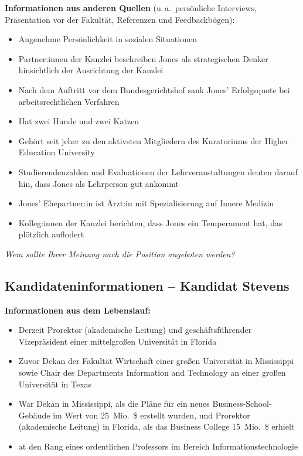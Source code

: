 \textbf{Informationen aus anderen Quellen}
(u.\,a.\ persönliche Interviews, Präsentation vor der Fakultät, Referenzen und Feedbackbögen):
\begin{itemize}
  \item Angenehme Persönlichkeit in sozialen Situationen
  \item Partner:innen der Kanzlei beschreiben Jones als strategischen Denker hinsichtlich der Ausrichtung
    der Kanzlei
  \item Nach dem Auftritt vor dem Bundesgerichtshof sank Jones' Erfolgsquote bei arbeitsrechtlichen Verfahren
  \item Hat zwei Hunde und zwei Katzen
  \item Gehört seit jeher zu den aktivsten Mitgliedern des Kuratoriums der Higher Education
    University
  \item Studierendenzahlen und Evaluationen der Lehrveranstaltungen deuten darauf hin, dass Jones als
    Lehrperson gut ankommt
  \item Jones' Ehepartner:in ist Ärzt:in mit Spezialisierung auf Innere Medizin
  \item Kolleg:innen der Kanzlei berichten, dass Jones ein Temperament hat, das plötzlich auflodert
\end{itemize}

\vspace{1em}
\noindent\textit{Wem sollte Ihrer Meinung nach die Position angeboten werden?}
\underline{\hspace{6cm}}

\clearpage
\subsection*{Kandidateninformationen -- Kandidat Stevens}
\thispagestyle{empty}

\textbf{Informationen aus dem Lebenslauf:}
\begin{itemize}
  \item Derzeit Prorektor (akademische Leitung) und geschäftsführender Vizepräsident einer mittelgroßen
    Universität in Florida
  \item Zuvor Dekan der Fakultät Wirtschaft einer großen Universität in Mississippi sowie Chair des Departments
    Information and Technology an einer großen Universität in Texas
  \item War Dekan in Mississippi, als die Pläne für ein neues Business-School-Gebäude im Wert von
    25~Mio.\ \$ erstellt wurden, und Prorektor (akademische Leitung) in Florida, als das Business College
    15~Mio.\ \$ erhielt
  \item at den Rang eines ordentlichen Professors im Bereich Informationstechnologie
\end{itemize}

